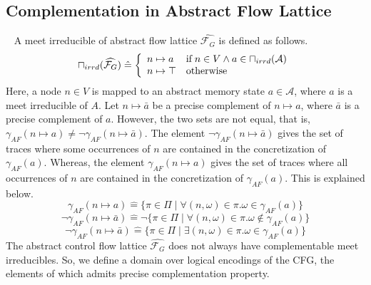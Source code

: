 \subsection{Complementation in Abstract Flow Lattice}~\label{complement-fg}
%
A meet irreducible of abstract flow lattice $\widehat{\mathcal{F}_{G}}$ is defined as
follows.
\[
  \sqcap_{irrd}(\widehat{\mathcal{F}_{G}}) \mathrel{\hat=} 
  \left\{\begin{array}{l@{\quad}l}
    n \mapsto a & \text{if}\; n \in V \wedge a \in \sqcap_{irrd}(\mathcal{A}) \\
    n \mapsto \top & \text{otherwise} \\
  \end{array}\right.
\]  
%
Here, a node $n \in V$ is mapped to an abstract memory state $a \in \mathcal{A}$, 
where $a$ is a meet irreducible of $A$.  Let $n \mapsto \bar{a}$ be a precise 
complement of $n \mapsto a$, where $\bar{a}$ is a precise complement of $a$.    
However, the two sets are not equal, that is, 
$\gamma_{AF}(n \mapsto a) \neq \neg \gamma_{AF}(n \mapsto \bar{a})$.
The element $\neg \gamma_{AF}(n \mapsto \bar{a})$ gives the set of traces 
where some occurrences of $n$ are contained in the concretization of
$\gamma_{AF}(a)$.  Whereas, the element $\gamma_{AF}(n \mapsto a)$ gives 
the set of traces where all occurrences of $n$ are contained in the 
concretization of $\gamma_{AF}(a)$.  This is explained below.
%
\[
  \gamma_{AF}(n \mapsto a) \mathrel{\hat=} \{\pi \in \Pi \mid \forall (n,\omega) \in
  \pi. \omega \in \gamma_{AF}(a) \}
\]
%
\[
  \neg \gamma_{AF}(n \mapsto \bar{a}) \mathrel{\hat=} \neg \{\pi \in \Pi \mid \forall (n,\omega) \in
  \pi. \omega \not\in \gamma_{AF}(a) \}
\]
%
\[
  \neg \gamma_{AF}(n \mapsto \bar{a}) \mathrel{\hat=} \{\pi \in \Pi \mid \exists (n,\omega) \in \pi. \omega \in \gamma_{AF}(a) \}
\]
%
The abstract control flow lattice $\widehat{\mathcal{F}_{G}}$ does not always have 
complementable meet irreducibles.  So, we define a domain over logical encodings 
of the CFG, the elements of which admits precise complementation property.
%
